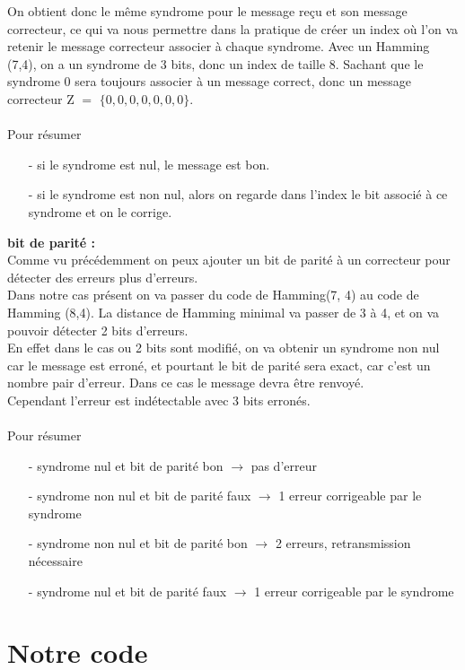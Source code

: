 \documentclass[12pt]{article}
\begin{document}
On obtient donc le même syndrome pour le message reçu et son message correcteur, ce qui va nous permettre dans la pratique de créer un index où l’on va retenir le message correcteur associer à chaque syndrome.
Avec un Hamming (7,4), on a un syndrome de 3 bits, donc un index de taille 8. Sachant que le syndrome 0 sera toujours associer à un message correct, donc un message correcteur    Z $=$ $\{0,0,0,0,0,0,0\}$. \\
\\
Pour résumer
\begin{enumerate}
  \item[-] si le syndrome est nul, le message est bon.
  \item[-] si le syndrome est non nul, alors on regarde dans l’index le bit associé à ce syndrome et on le corrige.
\end{enumerate}

 \textbf{bit de parité :}
\\
Comme vu précédemment on peux ajouter un bit de parité à un correcteur pour détecter des erreurs plus d’erreurs.\\
Dans notre cas présent on va passer du code de Hamming(7, 4) au code de Hamming (8,4). La distance de Hamming minimal va passer de 3 à 4, et on va pouvoir détecter 2 bits d’erreurs. \\
En effet dans le cas ou 2 bits sont modifié, on va obtenir un syndrome non nul car le message est erroné, et pourtant le bit de parité sera exact, car c’est un nombre pair d’erreur. Dans ce cas le message devra être renvoyé.\\
Cependant l’erreur est indétectable avec 3 bits erronés.\\
\\
Pour résumer
\begin{enumerate}
  \item[-] syndrome nul et bit de parité bon $\rightarrow$ pas d’erreur
  \item[-] syndrome non nul et bit de parité faux $\rightarrow$  1 erreur corrigeable par le syndrome
  \item[-] syndrome non nul et bit de parité bon $\rightarrow$ 2 erreurs, retransmission nécessaire
  \item[-] syndrome nul et bit de parité faux $\rightarrow$ 1 erreur corrigeable par le syndrome
\end{enumerate}
\newpage

\section{Notre code}
\label{sec:Notre code}
\end{document}
